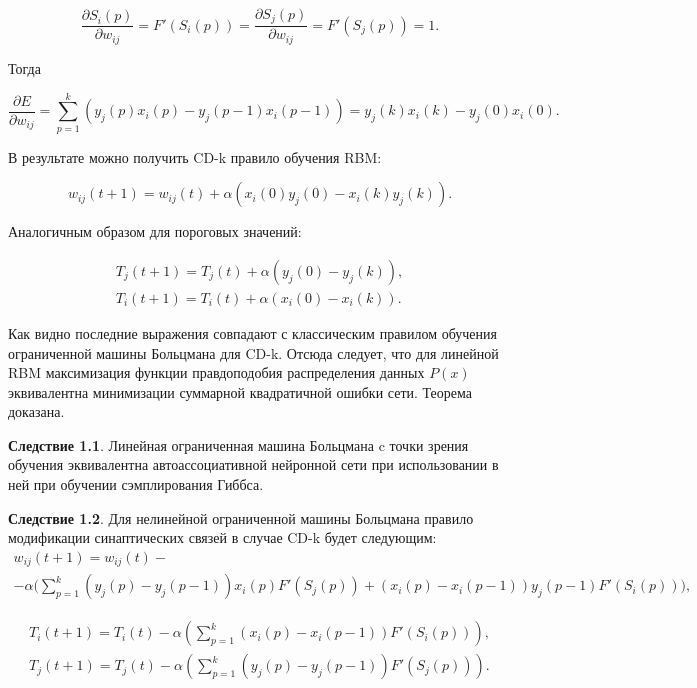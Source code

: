 \begin{equation*}
    \frac{\partial S_i(p)}{\partial w_{ij}}=F'(S_i(p))=\frac{\partial S_j(p)}{\partial w_{ij}}=F'(S_j(p))=1.
\end{equation*}

Тогда

\begin{equation*}
    \frac{\partial E}{\partial w_{ij}}=\sum_{p=1}^k (y_j(p)x_i(p)-y_j(p-1)x_i(p-1))=y_j(k)x_i(k)-y_j(0)x_i(0).
\end{equation*}

В результате можно получить CD-k правило обучения RBM:

\begin{equation*}
    w_{ij}(t+1)=w_{ij}(t)+\alpha(x_i(0)y_j(0)-x_i(k)y_j(k)).
\end{equation*}

Аналогичным образом для пороговых значений:

\begin{equation*}
\begin{aligned}
    T_{j}(t+1)=T_{j}(t)+\alpha(y_j(0)-y_j(k)),\\
    T_{i}(t+1)=T_{i}(t)+\alpha(x_i(0)-x_i(k)).
\end{aligned}
\end{equation*}

Как видно последние выражения совпадают с классическим правилом обучения ограниченной машины Больцмана для CD-k. Отсюда следует, что для линейной RBM максимизация функции правдоподобия распределения данных $P(x)$ эквивалентна минимизации суммарной квадратичной ошибки сети. Теорема доказана.

\textbf{Следствие 1.1}. Линейная ограниченная машина Больцмана c точки зрения обучения эквивалентна автоассоциативной нейронной сети при использовании в ней при обучении сэмплирования Гиббса.

\textbf{Следствие 1.2}. Для нелинейной ограниченной машины Больцмана правило модификации синаптических связей в случае CD-k будет следующим:
\begin{multline*}
    w_{ij}(t+1)=w_{ij}(t)-\\-\alpha\Bigg(\sum_{p=1}^k (y_j(p)-y_j(p-1))x_i(p)F'(S_j(p))+(x_i(p)-x_i(p-1))y_j(p-1)F'(S_i(p))\Bigg),
\end{multline*}

\begin{equation*}
\begin{aligned}
    T_i(t+1)=T_i(t)-\alpha\left(\sum_{p=1}^k (x_i(p)-x_i(p-1))F'(S_i(p))\right),\\
    T_j(t+1)=T_j(t)-\alpha\left(\sum_{p=1}^k (y_j(p)-y_j(p-1))F'(S_j(p))\right).
\end{aligned}
\end{equation*}

